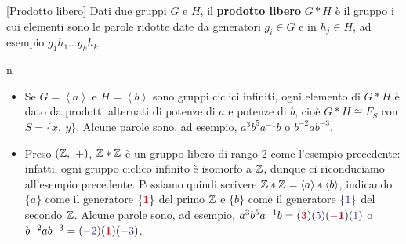 \begin{definition}{}[Prodotto libero]
	Dati due gruppi $G$ e $H$, il \textbf{prodotto libero} $G\ast H$ è il gruppo i cui elementi sono le parole ridotte date da generatori $g_i\in G$ e in $h_j\in H$, ad esempio $g_1h_1\ldots g_k h_k$.
\end{definition}
\begin{example}{n}~{}
		\begin{itemize}
		\item Se $G=\left<a\right>$ e $H=\left<b\right>$ sono gruppi ciclici infiniti, ogni elemento di $G\ast H$ è dato da prodotti alternati di potenze di $a$ e potenze di $b$, cioè $G\ast H\cong F_S$ con $S=\{x,\ y\}$. Alcune parole sono, ad esempio, $a^3b^5a^{-1}b$ o $b^{-2}ab^{-3}$.
		\item Preso $\left(\mathbb{Z},\ +\right)$, $\mathbb{Z}\ast\mathbb{Z}$ è un gruppo libero di rango 2 come l'esempio precedente: infatti, ogni gruppo ciclico infinito è isomorfo a $\mathbb{Z}$, dunque ci riconduciamo all'esempio precedente. Possiamo quindi scrivere $\mathbb{Z}\ast\mathbb{Z}=\left<a\right>\ast\left<b\right>$, indicando $\{a\}$ come il generatore $\{\textcolor{redill}{\textbf{1}}\}$ del primo $\mathbb{Z}$ e $\{b\}$ come il generatore $\{\textcolor{blueill}{1}\}$ del secondo $\mathbb{Z}$. Alcune parole sono, ad esempio, $a^3b^5a^{-1}b=(\textcolor{redill}{\mathbf{3}})(\textcolor{blueill}{5})(\textcolor{reddo}{\mathbf{-1}})(\textcolor{blueill}{1})$ o $b^{-2}ab^{-3}=(\textcolor{blueill}{-2})(\textcolor{redill}{\mathbf{1}})(\textcolor{blueill}{-3})$.
	\end{itemize}
\end{example}
